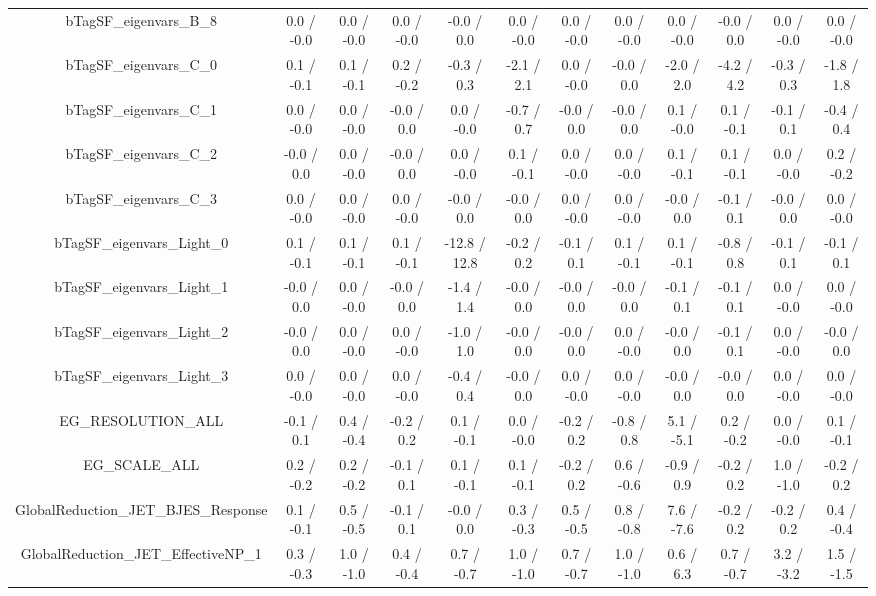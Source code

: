 \begin{table}[htbp]
\begin{center}
\begin{tabular}{|c|c|c|c|c|c|c|c|c|c|c|c|}
  bTagSF_eigenvars_B_8 & 0.0 / -0.0 & 0.0 / -0.0 & 0.0 / -0.0 & -0.0 / 0.0 & 0.0 / -0.0 & 0.0 / -0.0 & 0.0 / -0.0 & 0.0 / -0.0 & -0.0 / 0.0 & 0.0 / -0.0 & 0.0 / -0.0 \\ 
  bTagSF_eigenvars_C_0 & 0.1 / -0.1 & 0.1 / -0.1 & 0.2 / -0.2 & -0.3 / 0.3 & -2.1 / 2.1 & 0.0 / -0.0 & -0.0 / 0.0 & -2.0 / 2.0 & -4.2 / 4.2 & -0.3 / 0.3 & -1.8 / 1.8 \\ 
  bTagSF_eigenvars_C_1 & 0.0 / -0.0 & 0.0 / -0.0 & -0.0 / 0.0 & 0.0 / -0.0 & -0.7 / 0.7 & -0.0 / 0.0 & -0.0 / 0.0 & 0.1 / -0.0 & 0.1 / -0.1 & -0.1 / 0.1 & -0.4 / 0.4 \\ 
  bTagSF_eigenvars_C_2 & -0.0 / 0.0 & 0.0 / -0.0 & -0.0 / 0.0 & 0.0 / -0.0 & 0.1 / -0.1 & 0.0 / -0.0 & 0.0 / -0.0 & 0.1 / -0.1 & 0.1 / -0.1 & 0.0 / -0.0 & 0.2 / -0.2 \\ 
  bTagSF_eigenvars_C_3 & 0.0 / -0.0 & 0.0 / -0.0 & 0.0 / -0.0 & -0.0 / 0.0 & -0.0 / 0.0 & 0.0 / -0.0 & 0.0 / -0.0 & -0.0 / 0.0 & -0.1 / 0.1 & -0.0 / 0.0 & 0.0 / -0.0 \\ 
  bTagSF_eigenvars_Light_0 & 0.1 / -0.1 & 0.1 / -0.1 & 0.1 / -0.1 & -12.8 / 12.8 & -0.2 / 0.2 & -0.1 / 0.1 & 0.1 / -0.1 & 0.1 / -0.1 & -0.8 / 0.8 & -0.1 / 0.1 & -0.1 / 0.1 \\ 
  bTagSF_eigenvars_Light_1 & -0.0 / 0.0 & 0.0 / -0.0 & -0.0 / 0.0 & -1.4 / 1.4 & -0.0 / 0.0 & -0.0 / 0.0 & -0.0 / 0.0 & -0.1 / 0.1 & -0.1 / 0.1 & 0.0 / -0.0 & 0.0 / -0.0 \\ 
  bTagSF_eigenvars_Light_2 & -0.0 / 0.0 & 0.0 / -0.0 & 0.0 / -0.0 & -1.0 / 1.0 & -0.0 / 0.0 & -0.0 / 0.0 & 0.0 / -0.0 & -0.0 / 0.0 & -0.1 / 0.1 & 0.0 / -0.0 & -0.0 / 0.0 \\ 
  bTagSF_eigenvars_Light_3 & 0.0 / -0.0 & 0.0 / -0.0 & 0.0 / -0.0 & -0.4 / 0.4 & -0.0 / 0.0 & 0.0 / -0.0 & 0.0 / -0.0 & -0.0 / 0.0 & -0.0 / 0.0 & 0.0 / -0.0 & 0.0 / -0.0 \\ 
  EG_RESOLUTION_ALL & -0.1 / 0.1 & 0.4 / -0.4 & -0.2 / 0.2 & 0.1 / -0.1 & 0.0 / -0.0 & -0.2 / 0.2 & -0.8 / 0.8 & 5.1 / -5.1 & 0.2 / -0.2 & 0.0 / -0.0 & 0.1 / -0.1 \\ 
  EG_SCALE_ALL & 0.2 / -0.2 & 0.2 / -0.2 & -0.1 / 0.1 & 0.1 / -0.1 & 0.1 / -0.1 & -0.2 / 0.2 & 0.6 / -0.6 & -0.9 / 0.9 & -0.2 / 0.2 & 1.0 / -1.0 & -0.2 / 0.2 \\ 
  GlobalReduction_JET_BJES_Response & 0.1 / -0.1 & 0.5 / -0.5 & -0.1 / 0.1 & -0.0 / 0.0 & 0.3 / -0.3 & 0.5 / -0.5 & 0.8 / -0.8 & 7.6 / -7.6 & -0.2 / 0.2 & -0.2 / 0.2 & 0.4 / -0.4 \\ 
  GlobalReduction_JET_EffectiveNP_1 & 0.3 / -0.3 & 1.0 / -1.0 & 0.4 / -0.4 & 0.7 / -0.7 & 1.0 / -1.0 & 0.7 / -0.7 & 1.0 / -1.0 & 0.6 / 6.3 & 0.7 / -0.7 & 3.2 / -3.2 & 1.5 / -1.5 \\ 

\end{tabular}
\end{center}
\end{table}
